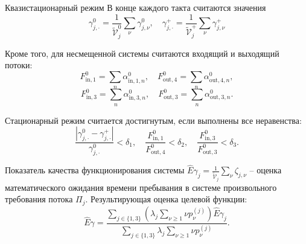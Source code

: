 \documentclass[10pt]{beamer}
\begin{document}
\begin{frame}{Квазистационарный режим}
    В конце каждого такта считаются значения
\begin{equation}
   \gamma_{j,\cdot}^0 = \frac{1}{\tilde{\mathcal{V}}_j^0}\sum_{\nu} \gamma_{j,\nu}^0, \quad \gamma_{j,\cdot}^+ = \frac{1}{\tilde{\mathcal{V}}_j^+}\sum_{\nu} \gamma_{j,\nu}^+ 
\end{equation}

Кроме того, для несмещенной системы  считаются входящий и выходящий потоки:
\begin{equation}
    F^{0}_{\text{in},1} = \sum_n \alpha^{0}_{\text{in},1,n}, \quad 
    F^{0}_{\text{out},4} = \sum_n \alpha^{0}_{\text{out},4,n},
\end{equation}
\begin{equation}
    F^{0}_{\text{in},3} = \sum_n \alpha^{0}_{\text{in},3,n}, \quad 
    F^{0}_{\text{out},3} = \sum_n \alpha^{0}_{\text{out},3,n}.
\end{equation}


Стационарный режим считается достигнутым, если выполнены все неравенства:
\begin{equation}
    \frac{|\gamma_{j,\cdot}^0 - \gamma_{j,\cdot}^+|}{\gamma_{j,\cdot}^0} < \delta_1, \quad
    \frac{F^{0}_{\text{in},1}}{F^{0}_{\text{out},4}} < \delta_2, \quad 
    \frac{F^{0}_{\text{in},3}}{F^{0}_{\text{out},3}} < \delta_3.
\end{equation}
\end{frame}


\begin{frame}{Показатель качества функционирования системы}
     $\hat{E}\gamma_{j}=\frac{1}{\tilde{\mathcal{V}}_j}\sum_{\nu}\zeta_{j,\nu}$  -- оценка математического ожидания времени пребывания в системе произвольного требования потока $\Pi_j$.
     \vfill
     Результирующая оценка целевой функции:
\begin{equation}
 \hat{E}\gamma=\frac{\sum_{j\in\{1,3\}} (\lambda_j \sum_{\nu\geqslant1}\nu p_{\nu}^{(j)})\hat{E}\gamma_{j} }{\sum_{j\in\{1,3\}} \lambda_j \sum_{\nu\geqslant1}\nu p_{\nu}^{(j)}}.
\end{equation}
\end{frame}
\end{document}
